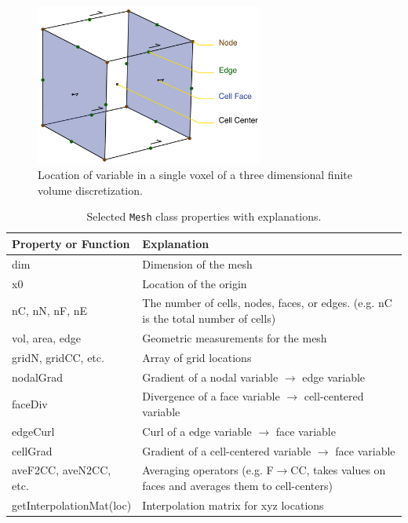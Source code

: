 \documentclass[preprint,review,3p,times,onecolumn,authoryear]{elsarticle}
\newcommand{\Mesh}{\texttt{Mesh}\xspace}
\begin{document}
{%
\begin{figure}[ht!]
\centering
\includegraphics[width=7.5cm]{images/cube.png}
\caption{Location of variable in a single voxel of a three dimensional finite volume discretization.}
\label{fig:meshLocations}
\end{figure}
}

{%
\begin{table}[ht]
\caption{Selected \Mesh class properties with explanations.}
\scriptsize
\label{table:Mesh}
  \begin{tabular}{  p{2.5cm}  p{4.5cm} }
    \hline

    Property or Function & Explanation \\ \hline
    dim  & Dimension of the mesh\\
    x0  & Location of the origin\\
    nC, nN, nF, nE & The number of cells, nodes, faces, or edges. (e.g. nC is the total number of cells)\\
    vol, area, edge  & Geometric measurements for the mesh\\ %
    gridN, gridCC, etc.  & Array of grid locations\\
    nodalGrad  &  Gradient of a nodal variable $\rightarrow$ edge variable\\
    faceDiv  & Divergence of a face variable $\rightarrow$ cell-centered variable\\
    edgeCurl  & Curl of a edge variable $\rightarrow$ face variable\\
    cellGrad  & Gradient of a cell-centered variable $\rightarrow$ face variable\\
    aveF2CC, aveN2CC, etc.  & Averaging operators (e.g. F$\rightarrow$CC, takes values on faces and averages them to cell-centers)\\
    getInterpolationMat(loc)  & Interpolation matrix for xyz locations\\

    \hline
  \end{tabular}
\end{table}
}
\end{document}
